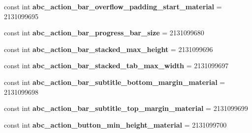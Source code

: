 \begin{DoxyCompactItemize}
\item 
\hypertarget{classClient_1_1Droid_1_1Resource_1_1Dimension_af8b895447ba6585c0263d117330abf11}{}const int {\bfseries abc\+\_\+action\+\_\+bar\+\_\+overflow\+\_\+padding\+\_\+start\+\_\+material} = 2131099695\label{classClient_1_1Droid_1_1Resource_1_1Dimension_af8b895447ba6585c0263d117330abf11}

\item 
\hypertarget{classClient_1_1Droid_1_1Resource_1_1Dimension_a052e3230c4a5255f994befe010a12ac5}{}const int {\bfseries abc\+\_\+action\+\_\+bar\+\_\+progress\+\_\+bar\+\_\+size} = 2131099680\label{classClient_1_1Droid_1_1Resource_1_1Dimension_a052e3230c4a5255f994befe010a12ac5}

\item 
\hypertarget{classClient_1_1Droid_1_1Resource_1_1Dimension_a48caebf9fe325f6d3f79bea4b4d8cb75}{}const int {\bfseries abc\+\_\+action\+\_\+bar\+\_\+stacked\+\_\+max\+\_\+height} = 2131099696\label{classClient_1_1Droid_1_1Resource_1_1Dimension_a48caebf9fe325f6d3f79bea4b4d8cb75}

\item 
\hypertarget{classClient_1_1Droid_1_1Resource_1_1Dimension_a1fa57b56b79dc0d29f94bdb9f63876cd}{}const int {\bfseries abc\+\_\+action\+\_\+bar\+\_\+stacked\+\_\+tab\+\_\+max\+\_\+width} = 2131099697\label{classClient_1_1Droid_1_1Resource_1_1Dimension_a1fa57b56b79dc0d29f94bdb9f63876cd}

\item 
\hypertarget{classClient_1_1Droid_1_1Resource_1_1Dimension_ac418790a05082fe882d4f970d1125420}{}const int {\bfseries abc\+\_\+action\+\_\+bar\+\_\+subtitle\+\_\+bottom\+\_\+margin\+\_\+material} = 2131099698\label{classClient_1_1Droid_1_1Resource_1_1Dimension_ac418790a05082fe882d4f970d1125420}

\item 
\hypertarget{classClient_1_1Droid_1_1Resource_1_1Dimension_ac3c0dcd91fc3d3a50caa9aceece156f2}{}const int {\bfseries abc\+\_\+action\+\_\+bar\+\_\+subtitle\+\_\+top\+\_\+margin\+\_\+material} = 2131099699\label{classClient_1_1Droid_1_1Resource_1_1Dimension_ac3c0dcd91fc3d3a50caa9aceece156f2}

\item 
\hypertarget{classClient_1_1Droid_1_1Resource_1_1Dimension_ab9a13e2eda43fc8978ff8bf9f87f3fd2}{}const int {\bfseries abc\+\_\+action\+\_\+button\+\_\+min\+\_\+height\+\_\+material} = 2131099700\label{classClient_1_1Droid_1_1Resource_1_1Dimension_ab9a13e2eda43fc8978ff8bf9f87f3fd2}


\end{DoxyCompactItemize}
